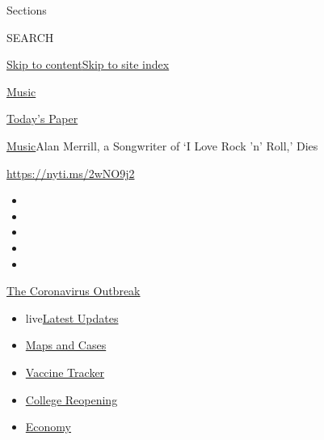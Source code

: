 Sections

SEARCH

\protect\hyperlink{site-content}{Skip to
content}\protect\hyperlink{site-index}{Skip to site index}

\href{https://www.nytimes.com/section/arts/music}{Music}

\href{https://myaccount.nytimes.com/auth/login?response_type=cookie\&client_id=vi}{}

\href{https://www.nytimes.com/section/todayspaper}{Today's Paper}

\href{/section/arts/music}{Music}\textbar{}Alan Merrill, a Songwriter of
`I Love Rock 'n' Roll,' Dies

\url{https://nyti.ms/2wNO9j2}

\begin{itemize}
\item
\item
\item
\item
\item
\end{itemize}

\href{https://www.nytimes.com/news-event/coronavirus?action=click\&pgtype=Article\&state=default\&region=TOP_BANNER\&context=storylines_menu}{The
Coronavirus Outbreak}

\begin{itemize}
\tightlist
\item
  live\href{https://www.nytimes.com/2020/08/03/world/coronavirus-covid-19.html?action=click\&pgtype=Article\&state=default\&region=TOP_BANNER\&context=storylines_menu}{Latest
  Updates}
\item
  \href{https://www.nytimes.com/interactive/2020/us/coronavirus-us-cases.html?action=click\&pgtype=Article\&state=default\&region=TOP_BANNER\&context=storylines_menu}{Maps
  and Cases}
\item
  \href{https://www.nytimes.com/interactive/2020/science/coronavirus-vaccine-tracker.html?action=click\&pgtype=Article\&state=default\&region=TOP_BANNER\&context=storylines_menu}{Vaccine
  Tracker}
\item
  \href{https://www.nytimes.com/2020/08/02/us/covid-college-reopening.html?action=click\&pgtype=Article\&state=default\&region=TOP_BANNER\&context=storylines_menu}{College
  Reopening}
\item
  \href{https://www.nytimes.com/live/2020/08/03/business/stock-market-today-coronavirus?action=click\&pgtype=Article\&state=default\&region=TOP_BANNER\&context=storylines_menu}{Economy}
\end{itemize}

